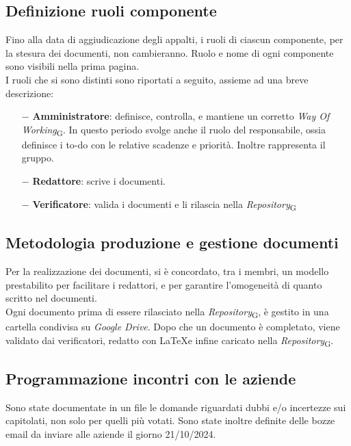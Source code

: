 \documentclass{article}
\begin{document}
    \subsection{Definizione ruoli componente}
    Fino alla data di aggiudicazione degli appalti, i ruoli di ciascun componente, per la stesura dei documenti, non cambieranno. Ruolo e nome di ogni componente sono visibili nella prima pagina.\\
    I ruoli che si sono distinti sono riportati a seguito, assieme ad una breve descrizione:
    \begin{itemize}
        \item[$-$] \textbf{Amministratore}: definisce, controlla, e mantiene un corretto \textit{Way Of Working}\textsubscript{G}. In questo periodo svolge anche il ruolo del responsabile, ossia definisce i to-do con le relative scadenze  e priorità. Inoltre rappresenta il gruppo.
        \item[$-$] \textbf{Redattore}: scrive i documenti.
        \item[$-$] \textbf{Verificatore}: valida i documenti e li rilascia nella \textit{Repository}\textsubscript{G}
    \end{itemize}
    \subsection{Metodologia produzione e gestione documenti}
    Per la realizzazione dei documenti, si è concordato, tra i membri, un modello prestabilito per facilitare i redattori, e per garantire l’omogeneità di quanto scritto nel documenti.\\
    Ogni documento prima di essere rilasciato nella \textit{Repository}\textsubscript{G}, è gestito in una cartella condivisa su \textit{Google Drive}. Dopo che un documento è completato, viene validato dai verificatori, redatto con \LaTeX e infine caricato nella \textit{Repository}\textsubscript{G}.
    \subsection{Programmazione incontri con le aziende}
    Sono state documentate in un file le domande riguardati dubbi e/o incertezze sui capitolati, non solo per quelli più votati. Sono state inoltre definite delle bozze email da inviare alle aziende il giorno 21/10/2024.
\end{document}
